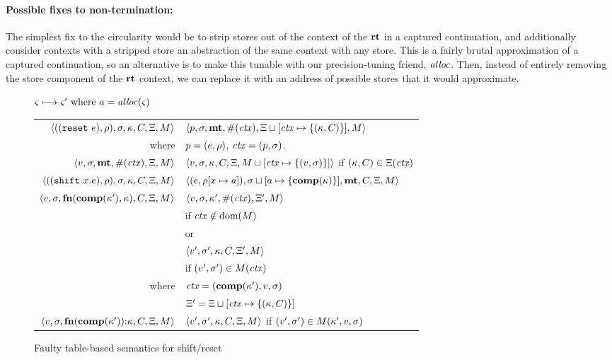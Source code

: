 \paragraph{Possible fixes to non-termination:} The simplest fix to the circularity would be to strip stores out of the context of the $\mathbf{rt}$ in a captured continuation, and additionally consider contexts with a stripped store an abstraction of the same context with any store.
%
This is a fairly brutal approximation of a captured continuation, so an alternative is to make this tunable with our precision-tuning friend, $\mathit{alloc}$.
%
Then, instead of entirely removing the store component of the $\mathbf{rt}$ context, we can replace it with an address of possible stores that it would approximate.

\begin{figure}
  \centering
  $\varsigma \longmapsto \varsigma' \text{ where } a = \mathit{alloc}(\varsigma)$ \\
  \begin{tabular}{r|l}
    \hline
    $\langle ((\texttt{reset}\ e), \rho), \sigma, \kappa, C, \Xi, M \rangle$
    &
    $\langle p, \sigma, \mathbf{mt}, \#(\mathit{ctx}), \Xi\sqcup[\mathit{ctx} \mapsto \{ (\kappa,C) \}], M \rangle$
    \\
    where & $p = (e, \rho)$, $\mathit{ctx} = (p, \sigma)$.
    \\
    $\langle v, \sigma, \mathbf{mt}, \#(\mathit{ctx}), \Xi, M \rangle$
    &
    $\langle v, \sigma, {\kappa}, {C}, \Xi, M\sqcup[\mathit{ctx} \mapsto \{ (v,\sigma) \}] \rangle$
    if $(\kappa,C) \in \Xi(\mathit{ctx})$
    \\
    $\langle ((\texttt{shift}\ x. e), \rho), \sigma, \kappa, C, \Xi, M \rangle$
    &
    $\langle (e, \rho[x \mapsto a]), \sigma\sqcup[a \mapsto \{ \mathbf{comp}(\kappa) \}],\mathbf{mt},C,\Xi,M \rangle$
    \\
    $\langle v,\sigma,\mathbf{fn}{}(\mathbf{comp}(\kappa'), \kappa), C, \Xi, M \rangle$
    &
    $\langle v, \sigma, \kappa', \#(\mathit{ctx}), \Xi',M \rangle$
    \\ & \quad if $\mathit{ctx} \notin \text{dom}(M)$
    \\
    & or \\
    & $\langle v', \sigma', \kappa, C, \Xi',M \rangle$
    \\ & \quad if $(v',\sigma') \in M(\mathit{ctx})$
    \\
    where & $\mathit{ctx} = (\mathbf{comp}(\kappa'), v, \sigma)$ \\
          & $\Xi' = \Xi\sqcup[\mathit{ctx} \mapsto \{ (\kappa,C) \}]$
    \\
    $\langle v,\sigma,\mathbf{fn}{}(\mathbf{comp}(\kappa')){\tt :} \kappa, C, \Xi, M \rangle$
    &
    $\langle v', \sigma', \kappa, C, \Xi,M \rangle$ if $(v',\sigma') \in M(\kappa',v,\sigma)$
  \end{tabular}  
  \caption{Faulty table-based semantics for shift/reset}
  \label{fig:shift-reset-table0}
\end{figure}

